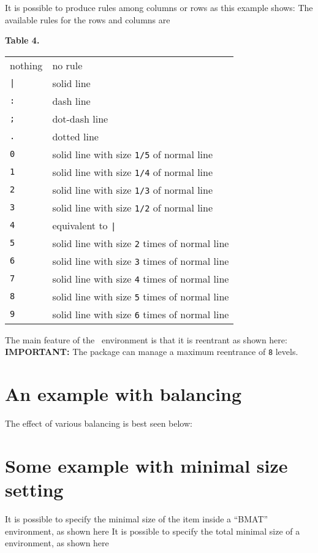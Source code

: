 \documentclass[a4paper,final,11pt]{article}
\begin{document}
It is possible to produce rules among columns or rows as this
example shows:
The available rules for the rows and columns are
\begin{center}
  \par
  \textbf{Table 4.} \\[1em]
  \begin{tabular}{|l|l|}
    \hline
    nothing  & no rule \\
    \verb+|+ & solid line \\
    \verb|:| & dash line \\
    \verb|;| & dot-dash line \\
    \verb|.| & dotted line \\
    \verb|0| & solid line with size \verb|1/5| of normal line \\
    \verb|1| & solid line with size \verb|1/4| of normal line \\
    \verb|2| & solid line with size \verb|1/3| of normal line \\
    \verb|3| & solid line with size \verb|1/2| of normal line \\
    \verb|4| & equivalent to \verb+|+ \\
    \verb|5| & solid line with size \verb|2| times of normal line \\
    \verb|6| & solid line with size \verb|3| times of normal line \\
    \verb|7| & solid line with size \verb|4| times of normal line \\
    \verb|8| & solid line with size \verb|5| times of normal line \\
    \verb|9| & solid line with size \verb|6| times of normal line \\
    \hline
  \end{tabular}
  \par
\end{center}
The main feature of the ~environment
is that it is reentrant as shown here:
\textbf{IMPORTANT:} The package can manage a maximum reentrance
of \verb|8| levels.

\section{An example with balancing}
The effect of various balancing is best seen below:
%
%

\section{Some example with minimal size setting}
It is possible to specify the minimal size of the item inside a
``BMAT'' environment, as shown here
It is possible to specify the total minimal size of a
 environment, as shown here
\end{document}
